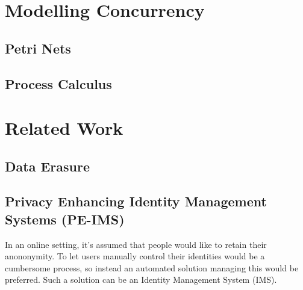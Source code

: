 
\section{Modelling Concurrency}

\subsection{Petri Nets}

\subsection{Process Calculus}



\section{Related Work}

\subsection{Data Erasure}


\subsection{Privacy Enhancing Identity Management Systems (PE-IMS)}



In an online setting, it's assumed that people would like to retain their anononymity.\cite{hansen2004privacy} To let users manually control their identities would be a cumbersome process, so instead an automated solution managing this would be preferred. Such a solution can be an Identity Management System (IMS).

